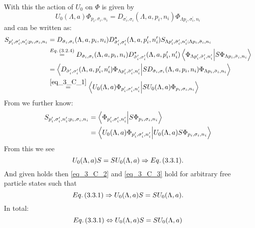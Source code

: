 \begin{widetext}
	With this the action of $U_0$ on $\Phi$ is given by
	\begin{equation}
		U_0(\Lambda,a)\Phi_{p_i,\sigma_i,n_i}=D_{\sigma_i^\prime,\sigma_i}(\Lambda,a,p_i,n_i)\Phi_{\Lambda p_i,\sigma_i^\prime,n_i}\label{eq_3_C_1}
	\end{equation}
	and  can be written as:
	\begin{align}
		S_{p_i^\prime,\sigma_i^\prime,n_i^\prime;p_i,\sigma_i,n_i}
		&=D_{\bar{\sigma}_i,\sigma_i}(\Lambda,a,p_i,n_i)
		D_{\bar{\sigma}_i^\prime,\sigma_i^\prime}^\star(\Lambda,a,p_i^\prime,n_i^\prime)
		S_{\Lambda p_i^\prime,\bar{\sigma}_i^\prime,n_i^\prime;\Lambda p_i,\bar{\sigma}_i,n_i}\nonumber\\
		&\overset{Eq.\,({3.2.4})}{=}D_{\bar{\sigma}_i,\sigma_i}(\Lambda,a,p_i,n_i)
		D_{\bar{\sigma}_i^\prime,\sigma_i^\prime}^\star(\Lambda,a,p_i^\prime,n_i^\prime)
		\braket{\Phi_{\Lambda p_i^\prime,\bar{\sigma}_i^\prime,n_i^\prime}}{S\Phi_{\Lambda p_i,\bar{\sigma}_i,n_i}}\nonumber\\
		&=\braket{D_{\bar{\sigma}_i^\prime,\sigma_i^\prime}(\Lambda,a,p_i^\prime,n_i^\prime)\Phi_{\Lambda p_i^\prime,\bar{\sigma}_i^\prime,n_i^\prime}}
		{S D_{\bar{\sigma}_i,\sigma_i}(\Lambda,a,p_i,n_i)\Phi_{\Lambda p_i,\bar{\sigma}_i,n_i}}\nonumber\\
		&\overset{\ref{eq_3_C_1}}{=}
		\braket{U_0(\Lambda,a)\Phi_{p_i^\prime,\sigma_i^\prime,n_i^\prime}}{S U_0(\Lambda, a) \Phi_{p_i,\sigma_i,n_i}}\label{eq_3_C_2}
	\end{align}
	From  we further know:
	\begin{align}
		S_{p_i^\prime,\sigma_i^\prime,n_i^\prime;p_i,\sigma_i,n_i}
		&=\braket{\Phi_{p_i^\prime,\sigma_i^\prime,n_i^\prime}}{S  \Phi_{p_i,\sigma_i,n_i}}\nonumber\\
		&=\braket{U_0(\Lambda,a)\Phi_{p_i^\prime,\sigma_i^\prime,n_i^\prime}}{ U_0(\Lambda, a) S\Phi_{p_i,\sigma_i,n_i}}\label{eq_3_C_3}
	\end{align}
	From this we see
	\[U_0(\Lambda, a)S=S U_0(\Lambda, a) \Rightarrow Eq.\,({3.3.1}).\]
	And given  holds then \ref{eq_3_C_2} and \ref{eq_3_C_3} hold for arbitrary free particle states such that
	\[Eq.\,({3.3.1})\Rightarrow U_0(\Lambda, a)S=S U_0(\Lambda, a).\]
	In total:
	\[Eq.\,({3.3.1})\Leftrightarrow U_0(\Lambda, a)S=S U_0(\Lambda, a)\]
\end{widetext}

